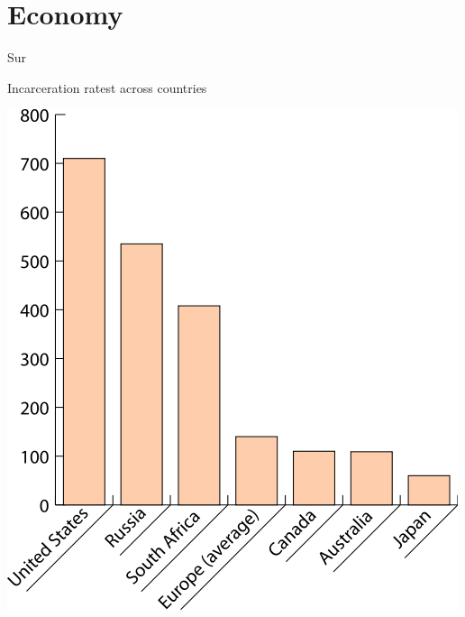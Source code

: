 \documentclass[print,Draft]{faosyb}
\begin{document}
\lipsum[1-9]


\section{Economy}

\lipsum[1-4]


\begin{chart}{S}{ur}
\caption{Incarceration ratest across countries}
\label{chart:incarceration}
\includegraphics[width=\chartwidth,height=\chartheight]{incarceration}  
\end{chart}
\end{document}
